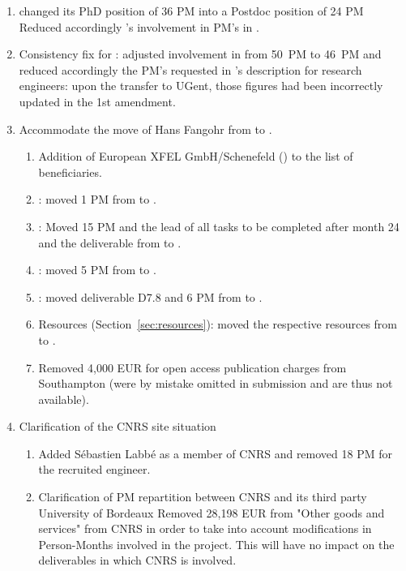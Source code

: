 \begin{enumerate}
\item {} changed its PhD position of 36 PM into a Postdoc position of 24 PM
  Reduced accordingly 's involvement in PM's in .
\item Consistency fix for : adjusted involvement in  from 50~PM to 46~PM and reduced accordingly the PM's
  requested in 's description for research engineers: upon
  the transfer to UGent, those figures had been incorrectly updated in
  the 1st amendment.
\item Accommodate the move of Hans Fangohr from  to
  .
\begin{enumerate}
\item Addition of European XFEL GmbH/Schenefeld () to the
  list of beneficiaries.
\item {}: moved 1 PM from  to .
\item {}:  Moved 15 PM and the lead of all tasks to be
  completed after month 24 and the deliverable  from
   to .
\item {}: moved 5 PM from  to .
\item {}: moved deliverable D7.8 and 6 PM from
   to . %

\item Resources (Section~\ref{sec:resources}): moved the respective resources from
   to .

\item Removed 4,000 EUR for open access publication charges from
  Southampton (were by mistake omitted in submission and are thus not available).
\end{enumerate}


\item  Clarification of the CNRS site situation
\begin{enumerate}
\item Added S\'ebastien Labb\'e as a member of CNRS and removed 18 PM for
  the recruited engineer.
\item Clarification of PM repartition between CNRS and its third
  party University of Bordeaux
Removed 28,198 EUR from "Other goods and services" from
  CNRS in order to take into account modifications in Person-Months
  involved in the project. This will have no impact on the deliverables
  in which CNRS is involved.
\end{enumerate}


\end{enumerate}
